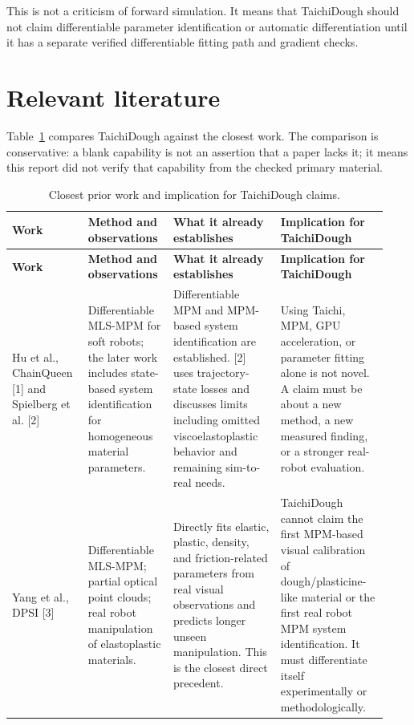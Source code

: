 \documentclass[11pt]{article}
\begin{document}
This is not a criticism of forward simulation. It means that TaichiDough should not claim differentiable parameter identification or automatic differentiation until it has a separate verified differentiable fitting path and gradient checks.

\section{Relevant literature}

Table~\ref{tab:prior} compares TaichiDough against the closest work. The comparison is conservative: a blank capability is not an assertion that a paper lacks it; it means this report did not verify that capability from the checked primary material.

\begin{longtable}{p{0.19\linewidth}p{0.20\linewidth}p{0.27\linewidth}p{0.27\linewidth}}
\caption{Closest prior work and implication for TaichiDough claims.}\label{tab:prior}\\
\toprule
\textbf{Work} & \textbf{Method and observations} & \textbf{What it already establishes} & \textbf{Implication for TaichiDough}\\
\midrule
\endfirsthead
\toprule
\textbf{Work} & \textbf{Method and observations} & \textbf{What it already establishes} & \textbf{Implication for TaichiDough}\\
\midrule
\endhead
Hu et al., ChainQueen [1] and Spielberg et al. [2] & Differentiable MLS-MPM for soft robots; the later work includes state-based system identification for homogeneous material parameters. & Differentiable MPM and MPM-based system identification are established. [2] uses trajectory-state losses and discusses limits including omitted viscoelastoplastic behavior and remaining sim-to-real needs. & Using Taichi, MPM, GPU acceleration, or parameter fitting alone is not novel. A claim must be about a new method, a new measured finding, or a stronger real-robot evaluation.\\
\addlinespace
Yang et al., DPSI [3] & Differentiable MLS-MPM; partial optical point clouds; real robot manipulation of elastoplastic materials. & Directly fits elastic, plastic, density, and friction-related parameters from real visual observations and predicts longer unseen manipulation. This is the closest direct precedent. & TaichiDough cannot claim the first MPM-based visual calibration of dough/plasticine-like material or the first real robot MPM system identification. It must differentiate itself experimentally or methodologically.\\

\end{longtable}
\end{document}
